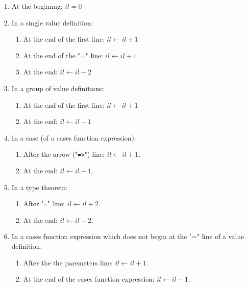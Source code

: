 \documentclass{article}
\begin{document}
\begin{enumerate}

\item
At the beginnng: $il = 0$

\item
In a single value definition:
  \begin{enumerate}

  \item
  At the end of the first line: $il \leftarrow il + 1$

  \item
  At the end of the "=" line: $il \leftarrow il + 1$

  \item
  At the end: $il \leftarrow il - 2$
  \end{enumerate}

\item
In a group of value definitions:
  \begin{enumerate}

  \item
  At the end of the first line: $il \leftarrow il + 1$

  \item
  At the end: $il \leftarrow il - 1$
  \end{enumerate}

\item
In a case (of a cases function expression):
  \begin{enumerate}

  \item
  After the arrow ("\verb|=>|") line: $il \leftarrow il + 1$.

  \item
  At the end: $il \leftarrow il - 1$.
  \end{enumerate}

\item
In a type theorem:
  \begin{enumerate}

  \item
  After "\verb|=|" line: $il \leftarrow il + 2$.

  \item
  At the end: $il \leftarrow il - 2$.
  \end{enumerate}

\item
In a cases function expression which does not begin at the "=" line of a value
definition:
  \begin{enumerate}

  \item
  After the the paremeters line: $il \leftarrow il + 1$.

  \item
  At the end of the cases function expression: $il \leftarrow il - 1$.

  \end{enumerate}

\end{enumerate}
\end{document}

